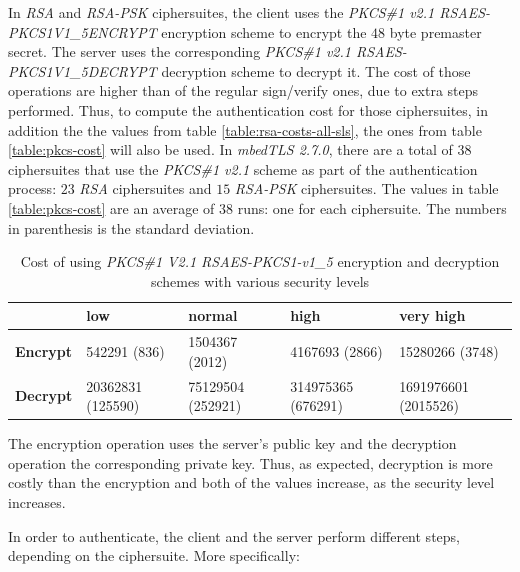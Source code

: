 \documentclass{llncs}
\begin{document}
In \textit{RSA} and \textit{RSA-PSK} ciphersuites, the client uses the \textit{PKCS\#1 v2.1 RSAES-PKCS1\-V1\_5\-ENCRYPT}\cite{RFC3447}
encryption scheme to encrypt  the $48$ byte premaster secret. The server uses the corresponding \textit{PKCS\#1 v2.1 RSAES-PKCS1\-V1\_5\-DECRYPT}\cite{RFC3447}
decryption scheme to decrypt it. The cost of those operations are higher than of the regular sign/verify ones, due to extra steps performed.
Thus, to compute the authentication cost for those ciphersuites, in addition the the values from table \ref{table:rsa-costs-all-sls}, the ones
from table \ref{table:pkcs-cost} will also be used. In \textit{mbedTLS 2.7.0}, there are a total of
$38$ ciphersuites that use the \textit{PKCS\#1 v2.1} scheme as part of the authentication process: $23$
\textit{RSA} ciphersuites and $15$ \textit{RSA-PSK} ciphersuites. The values in table \ref{table:pkcs-cost} are an average
of $38$ runs: one for each ciphersuite. The numbers in parenthesis is the standard deviation.

\begin{table}[]
  \begin{tabular}{|l|l|l|l|l|}
  \hline
                   & \textbf{low}      & \textbf{normal}   & \textbf{high}      & \textbf{very high}   \\ \hline
  \textbf{Encrypt} & 542291 (836)      & 1504367 (2012)    & 4167693 (2866)     & 15280266 (3748)      \\ \hline
  \textbf{Decrypt} & 20362831 (125590) & 75129504 (252921) & 314975365 (676291) & 1691976601 (2015526) \\ \hline
  \end{tabular}
  \centering \caption{\label{table:pkcs-costt} Cost of using \textit{PKCS\#1 V2.1 RSAES-PKCS1-v1\_5} encryption and decryption schemes with various security levels}
  \end{table}

The encryption operation uses the server's public key and the decryption operation the corresponding private key. Thus, as expected,
decryption is more costly than the encryption and both of the values increase, as the security level increases.

In order to authenticate, the client and the server perform different steps, depending on the ciphersuite. More specifically:
\end{document}
